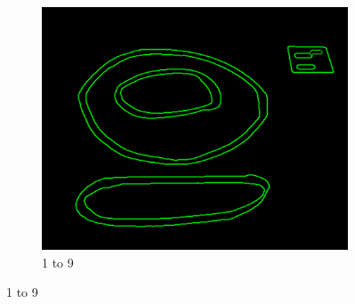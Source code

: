 \documentclass[11pt]{article}
\begin{document}
\begin{figure}
\begin{subfigure}[t]{0.32\textwidth}
		\includegraphics[scale=0.28]{pics/elimination/joinedAfterRemoval9.png}
		\caption{1 to 9}
		\label{construction9}
	\end{subfigure}


\end{figure}
\end{document}
